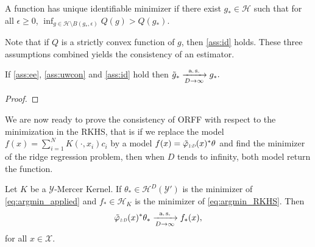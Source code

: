 \begin{assumption}[ID] 
\label{ass:id}
A function has unique identifiable minimizer if there exist $g_*\in\mathcal{H}$ such that for all $\epsilon\ge 0$, $\inf_{g\in \mathcal{H}\setminus{B(g_*,\epsilon)}} Q(g)>Q(g_*)$.
\end{assumption}
Note that if $Q$ is a strictly convex function of $g$, then \cref{ass:id} holds. These three assumptions combined yields the consistency of an estimator.
\begin{proposition} If
\cref{ass:ee}, \cref{ass:uwcon} and \cref{ass:id} hold then $\tilde{g}_* \xrightarrow[D\to\infty]{\text{a.\,s.}} g_*.$
\end{proposition}
\begin{proof}

\end{proof}
We are now ready to prove the consistency of ORFF with respect to the minimization in the RKHS, that is if we replace the model $f(x)=\sum_{i=1}^NK(\cdot, x_i)c_i$ by a model $f(x)=\tildePhi{1:D}(x)^\adjoint \theta$ and find the minimizer of the ridge regression problem, then when $D$ tends to infinity, both model return the  function.
\begin{proposition} Let $K$ be a $\mathcal{Y}$-Mercer Kernel. If $\theta_*\in\mathcal{H}^D\left(\mathcal{Y}'\right)$ is the minimizer of \cref{eq:argmin_applied} and $f_*\in\mathcal{H}_K$ is the minimizer of \cref{eq:argmin_RKHS}. Then 
\begin{dmath}
\tildePhi{1:D}(x)^\adjoint\theta_* \converges{\asurely}{D\to\infty}f_*(x),
\end{dmath}
for all $x\in\mathcal{X}$.
\end{proposition}
